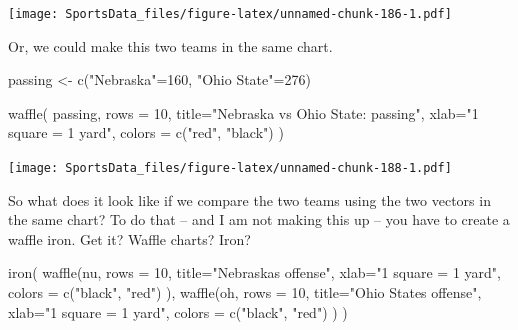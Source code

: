 \documentclass[
]{book}
\newenvironment{Shaded}{\begin{snugshade}}{\end{snugshade}}
\newcommand{\AttributeTok}[1]{\textcolor[rgb]{0.77,0.63,0.00}{#1}}
\newcommand{\DecValTok}[1]{\textcolor[rgb]{0.00,0.00,0.81}{#1}}
\newcommand{\FunctionTok}[1]{\textcolor[rgb]{0.00,0.00,0.00}{#1}}
\newcommand{\NormalTok}[1]{#1}
\newcommand{\OtherTok}[1]{\textcolor[rgb]{0.56,0.35,0.01}{#1}}
\newcommand{\StringTok}[1]{\textcolor[rgb]{0.31,0.60,0.02}{#1}}
\begin{document}
\texttt{[image: SportsData\_files/figure-latex/unnamed-chunk-186-1.pdf]}

Or, we could make this two teams in the same chart.

\begin{Shaded}
\begin{Highlighting}[]
\NormalTok{passing }\OtherTok{\textless{}{-}} \FunctionTok{c}\NormalTok{(}\StringTok{"Nebraska"}\OtherTok{=}\DecValTok{160}\NormalTok{, }\StringTok{"Ohio State"}\OtherTok{=}\DecValTok{276}\NormalTok{)}
\end{Highlighting}
\end{Shaded}

\begin{Shaded}
\begin{Highlighting}[]
\FunctionTok{waffle}\NormalTok{(}
\NormalTok{        passing, }
        \AttributeTok{rows =} \DecValTok{10}\NormalTok{, }
        \AttributeTok{title=}\StringTok{"Nebraska vs Ohio State: passing"}\NormalTok{, }
        \AttributeTok{xlab=}\StringTok{"1 square = 1 yard"}\NormalTok{, }
        \AttributeTok{colors =} \FunctionTok{c}\NormalTok{(}\StringTok{"red"}\NormalTok{, }\StringTok{"black"}\NormalTok{)}
\NormalTok{)}
\end{Highlighting}
\end{Shaded}

\texttt{[image: SportsData\_files/figure-latex/unnamed-chunk-188-1.pdf]}

So what does it look like if we compare the two teams using the two vectors in the same chart? To do that -- and I am not making this up -- you have to create a waffle iron. Get it? Waffle charts? Iron?

\begin{Shaded}
\begin{Highlighting}[]
\FunctionTok{iron}\NormalTok{(}
 \FunctionTok{waffle}\NormalTok{(nu, }
        \AttributeTok{rows =} \DecValTok{10}\NormalTok{, }
        \AttributeTok{title=}\StringTok{"Nebraska\textquotesingle{}s offense"}\NormalTok{, }
        \AttributeTok{xlab=}\StringTok{"1 square = 1 yard"}\NormalTok{, }
        \AttributeTok{colors =} \FunctionTok{c}\NormalTok{(}\StringTok{"black"}\NormalTok{, }\StringTok{"red"}\NormalTok{)}
\NormalTok{        ),}
 \FunctionTok{waffle}\NormalTok{(oh, }
        \AttributeTok{rows =} \DecValTok{10}\NormalTok{, }
        \AttributeTok{title=}\StringTok{"Ohio State\textquotesingle{}s offense"}\NormalTok{, }
        \AttributeTok{xlab=}\StringTok{"1 square = 1 yard"}\NormalTok{, }
        \AttributeTok{colors =} \FunctionTok{c}\NormalTok{(}\StringTok{"black"}\NormalTok{, }\StringTok{"red"}\NormalTok{)}
\NormalTok{        )}
\NormalTok{)}
\end{Highlighting}
\end{Shaded}
\end{document}
